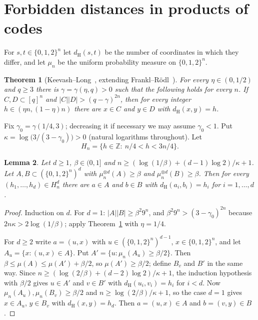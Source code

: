 \documentclass[11pt]{amsart}
\newtheorem{theorem}{Theorem}
\newtheorem{lemma}[theorem]{Lemma}
\theoremstyle{definition}
\theoremstyle{remark}
\newcommand{\Z}{\mathbb{Z}}
\newcommand{\dH}{d_{\mathrm H}}
\begin{document}
\section{Forbidden distances in products of codes}

For $s,t\in\{0,1,2\}^n$ let $\dH(s,t)$ be the number of coordinates in which they differ, and
let $\mu_n$ be the uniform probability measure on $\{0,1,2\}^n$.

\begin{theorem}[Keevash--Long~{\cite[Corollary~1.9]{KeevashLong}}, extending Frankl--R\"odl~\cite{FranklRodl}]
\label{thm:KL}
For every $\eta\in(0,1/2)$ and $q\ge3$ there is $\gamma=\gamma(\eta,q)>0$ such that the
following holds for every $n$. If $C,D\subset[q]^n$ and $|C||D|>(q-\gamma)^{2n}$, then for every
integer $h\in(\eta n,(1-\eta)n)$ there are $x\in C$ and $y\in D$ with $\dH(x,y)=h$.
\end{theorem}

Fix $\gamma_0=\gamma(1/4,3)$; decreasing it if necessary we may assume $\gamma_0<1$. Put
$\kappa=\log\bigl(3/(3-\gamma_0)\bigr)>0$ (natural logarithms throughout). Let
\[
  H_n=\{h\in\Z:\ n/4<h<3n/4\}.
\]

\begin{lemma}\label{lem:product}
Let $d\ge1$, $\beta\in(0,1]$ and $n\ge(\log(1/\beta)+(d-1)\log2)/\kappa+1$. Let
$A,B\subset(\{0,1,2\}^n)^d$ with $\mu_n^{\otimes d}(A)\ge \beta$ and $\mu_n^{\otimes d}(B)\ge \beta$.
Then for every $(h_1,\dots,h_d)\in H_n^d$ there are $a\in A$ and $b\in B$ with
$\dH(a_i,b_i)=h_i$ for $i=1,\dots,d$.
\end{lemma}

\begin{proof}
Induction on $d$. For $d=1$: $|A||B|\ge \beta^2 9^n$, and $\beta^2 9^n>(3-\gamma_0)^{2n}$
because $2n\kappa>2\log(1/\beta)$; apply Theorem~\ref{thm:KL} with $\eta=1/4$.

For $d\ge2$ write $a=(u,x)$ with $u\in(\{0,1,2\}^n)^{d-1}$, $x\in\{0,1,2\}^n$, and let
$A_u=\{x:(u,x)\in A\}$. Put $A'=\{u:\mu_n(A_u)\ge \beta/2\}$. Then
$\beta\le\mu(A)\le\mu(A')+\beta/2$, so $\mu(A')\ge \beta/2$; define $B_v$ and $B'$ in the same
way. Since $n\ge(\log(2/\beta)+(d-2)\log2)/\kappa+1$, the induction hypothesis with $\beta/2$
gives $u\in A'$ and $v\in B'$ with $\dH(u_i,v_i)=h_i$ for $i<d$. Now
$\mu_n(A_u),\mu_n(B_v)\ge \beta/2$ and $n\ge\log(2/\beta)/\kappa+1$, so the case $d=1$ gives
$x\in A_u$, $y\in B_v$ with
$\dH(x,y)=h_d$. Then $a=(u,x)\in A$ and $b=(v,y)\in B$.
\end{proof}
\end{document}
